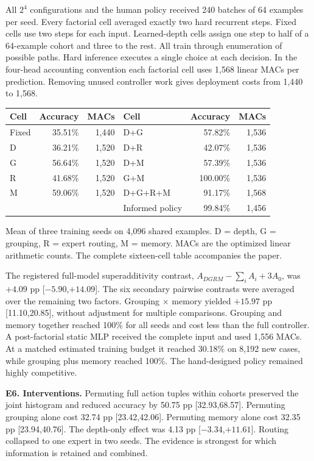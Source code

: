 \documentclass[11pt,letterpaper]{article}
\newcommand{\topic}[1]{\par\medskip\noindent\textbf{#1}\enspace}
\newcommand{\captext}[1]{{\small\color{grey}#1\par}}
\begin{document}
All $2^4$ configurations and the human policy received 240 batches of 64 examples per seed. Every factorial cell averaged exactly two hard recurrent steps. Fixed cells use two steps for each input. Learned-depth cells assign one step to half of a 64-example cohort and three to the rest. All train through enumeration of possible paths. Hard inference executes a single choice at each decision. In the four-head accounting convention each factorial cell uses 1,568 linear MACs per prediction. Removing unused controller work gives deployment costs from 1,440 to 1,568.
\begin{center}
\begin{tabular}{lrr@{\qquad}lrr}\toprule
Cell & Accuracy & MACs & Cell & Accuracy & MACs\\\midrule
Fixed & 35.51\% & 1,440 & D+G & 57.82\% & 1,536\\
D & 36.21\% & 1,520 & D+R & 42.07\% & 1,536\\
G & 56.64\% & 1,520 & D+M & 57.39\% & 1,536\\
R & 41.68\% & 1,520 & G+M & 100.00\% & 1,536\\
M & 59.06\% & 1,520 & D+G+R+M & 91.17\% & 1,568\\
 & & & Informed policy & 99.84\% & 1,456\\\bottomrule
\end{tabular}
\end{center}
\captext{Mean of three training seeds on 4,096 shared examples. D = depth, G = grouping, R = expert routing, M = memory. MACs are the optimized linear arithmetic counts. The complete sixteen-cell table accompanies the paper.}

The registered full-model superadditivity contrast, $A_{DGRM}-\sum_i A_i+3A_0$, was $+4.09$ pp [$-5.90$,$+14.09$]. The six secondary pairwise contrasts were averaged over the remaining two factors. Grouping $\times$ memory yielded $+15.97$ pp [11.10,20.85], without adjustment for multiple comparisons. Grouping and memory together reached 100\% for all seeds and cost less than the full controller. A post-factorial static MLP received the complete input and used 1,556 MACs. At a matched estimated training budget it reached 30.18\% on 8,192 new cases, while grouping plus memory reached 100\%. The hand-designed policy remained highly competitive.

\topic{E6. Interventions.} Permuting full action tuples within cohorts preserved the joint histogram and reduced accuracy by 50.75 pp [32.93,68.57]. Permuting grouping alone cost 32.74 pp [23.42,42.06]. Permuting memory alone cost 32.35 pp [23.94,40.76]. The depth-only effect was 4.13 pp [$-3.34$,$+11.61$]. Routing collapsed to one expert in two seeds. The evidence is strongest for which information is retained and combined.
\newpage

\newpage

\newpage

\newpage

\newpage
\end{document}
